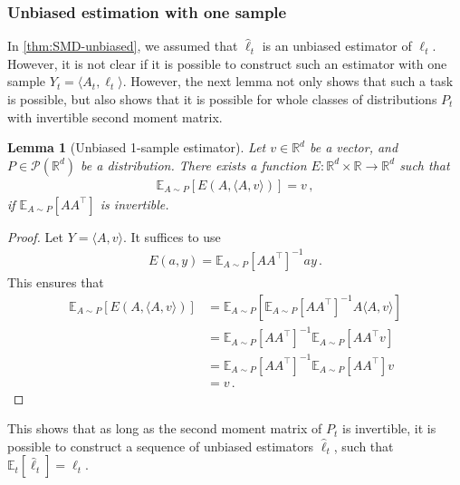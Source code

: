 \documentclass{article}
\theoremstyle{plain}
\newtheorem{lemma}[theorem]{Lemma}
\theoremstyle{definition}
\newcommand{\R}{\mathbb R}
\newcommand{\Rd}{\mathbb{R}^d}
\newcommand{\E}{\mathbb E}
\newcommand{\cP}{\mathcal P}
\newcommand{\hl}{\hat{\ell}\xspace}
\begin{document}
\subsubsection{Unbiased estimation with one sample}
In \cref{thm:SMD-unbiased}, we assumed that $\hl_t$ is an unbiased estimator of $\ell_t$.
However, it is not clear if it is possible to construct such an estimator
with one sample $Y_t = \langle A_t, \ell_t \rangle$.
However, the next lemma not only shows that such a task is possible,
but also shows that it is possible for whole classes of distributions
$P_t$ with invertible second moment matrix.
\begin{lemma}[Unbiased 1-sample estimator]
    \label{lem:1-sample-estimator}
    Let $v \in \R^d$ be a vector,
    and $P \in \cP(\Rd)$ be a distribution.
    There exists a function $E: \Rd \times \R \to \Rd$ such that
    \begin{align*}
        \E_{A \sim P}[E(A, \langle A, v \rangle)] = v\,,
    \end{align*}
    if $\E_{A \sim P}[A A^\top]$ is invertible.
\end{lemma}
\begin{proof}
    Let $Y = \langle A, v \rangle$.
    It suffices to use
    \begin{align*}
        E(a, y) = \E_{A \sim P}[A A^\top]^{-1} a  y\,.
    \end{align*}
    This ensures that
    \begin{align*}
        \E_{A \sim P}[E(A, \langle A, v \rangle)]
         & = \E_{A \sim P}[\E_{A \sim P}[A A^\top]^{-1} A  \langle A, v \rangle] \\
         & = \E_{A \sim P}[A A^\top]^{-1} \E_{A \sim P}[A  A^\top v]             \\
         & = \E_{A \sim P}[A A^\top]^{-1} \E_{A \sim P}[A A^\top]  v             \\
         & = v\,.
    \end{align*}
\end{proof}
This shows that as long as the second moment matrix of $P_t$ is invertible,
it is possible to construct a sequence of unbiased estimators $\hl_t$,
such that $\E_t[\hl_t] = \ell_t$.
\end{document}
